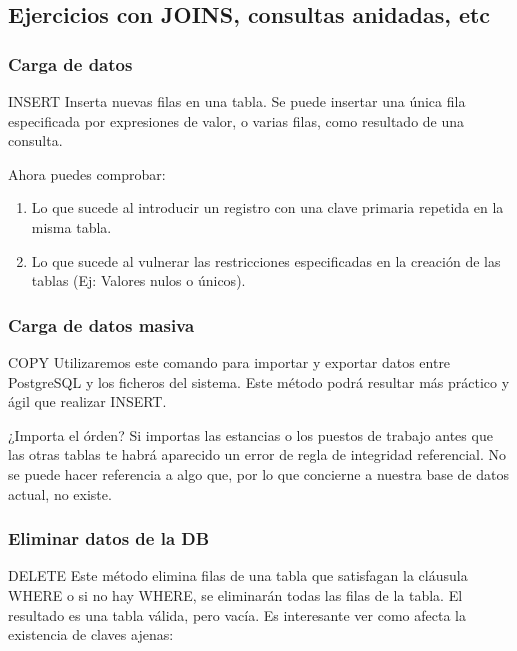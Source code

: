 \documentclass{classes/beamer_GeomaticaUA}
\begin{document}
\subsection{Ejercicios con JOINS, consultas anidadas, etc}
\begin{frame}[fragile]
\frametitle{Carga de datos}
\begin{block}{INSERT}
Inserta nuevas filas en una tabla. Se puede insertar una única fila especificada por expresiones de valor, o varias filas, como resultado de una consulta.
\end{block}



Ahora puedes comprobar:
\begin{enumerate}
\item Lo que sucede al introducir un registro con una clave primaria repetida en la misma tabla.
\item Lo que sucede al vulnerar las restricciones especificadas en la creación de las tablas (Ej: Valores nulos o únicos).
\end{enumerate}

\end{frame}


\begin{frame}[fragile]
\frametitle{Carga de datos masiva}

\begin{block}{COPY}
Utilizaremos este comando para importar y exportar datos entre PostgreSQL y los ficheros del sistema. Este método podrá resultar más práctico y ágil que realizar INSERT.
\end{block}



\begin{alertblock}{¿Importa el órden?}
Si importas las estancias o los puestos de trabajo antes que las otras tablas te habrá aparecido un error de regla de integridad referencial. No se puede hacer referencia a algo que, por lo que concierne a nuestra base de datos actual, no existe.
\end{alertblock}

\end{frame}


\begin{frame}[fragile]
\frametitle{Eliminar datos de la DB}

\begin{block}{DELETE}
Este método elimina filas de una tabla que satisfagan la cláusula WHERE o si no hay WHERE, se eliminarán todas las filas de la tabla. El resultado es una tabla válida, pero vacía. Es interesante ver como afecta la existencia de claves ajenas:
\end{block}



\end{frame}
\end{document}
